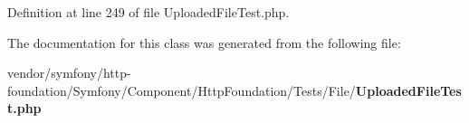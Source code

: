 Definition at line 249 of file Uploaded\+File\+Test.\+php.



The documentation for this class was generated from the following file\+:\begin{DoxyCompactItemize}
\item 
vendor/symfony/http-\/foundation/\+Symfony/\+Component/\+Http\+Foundation/\+Tests/\+File/{\bf Uploaded\+File\+Test.\+php}\end{DoxyCompactItemize}
